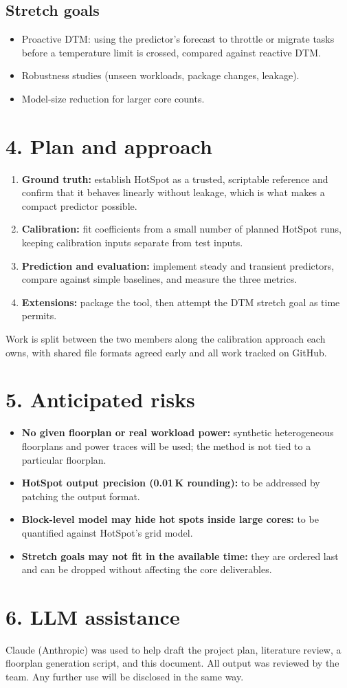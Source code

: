 \documentclass[11pt,a4paper]{article}
\begin{document}
\subsection*{Stretch goals}
\begin{itemize}
  \item Proactive DTM: using the predictor's forecast to throttle or migrate tasks before a
        temperature limit is crossed, compared against reactive DTM.
  \item Robustness studies (unseen workloads, package changes, leakage).
  \item Model-size reduction for larger core counts.
\end{itemize}

\section*{4. Plan and approach}
\begin{enumerate}
  \item \textbf{Ground truth:} establish HotSpot as a trusted, scriptable reference and confirm
        that it behaves linearly without leakage, which is what makes a compact predictor possible.
  \item \textbf{Calibration:} fit coefficients from a small number of planned HotSpot runs,
        keeping calibration inputs separate from test inputs.
  \item \textbf{Prediction and evaluation:} implement steady and transient predictors,
        compare against simple baselines, and measure the three metrics.
  \item \textbf{Extensions:} package the tool, then attempt the DTM stretch goal as time permits.
\end{enumerate}
Work is split between the two members along the calibration approach each owns, with shared file
formats agreed early and all work tracked on GitHub.

\section*{5. Anticipated risks}
\begin{itemize}
  \item \textbf{No given floorplan or real workload power:} synthetic heterogeneous floorplans and
        power traces will be used; the method is not tied to a particular floorplan.
  \item \textbf{HotSpot output precision (0.01\,K rounding):} to be addressed by patching the
        output format.
  \item \textbf{Block-level model may hide hot spots inside large cores:} to be quantified
        against HotSpot's grid model.
  \item \textbf{Stretch goals may not fit in the available time:} they are ordered last and
        can be dropped without affecting the core deliverables.
\end{itemize}

\section*{6. LLM assistance}
Claude (Anthropic) was used to help draft the project plan, literature review, a floorplan
generation script, and this document. All output was reviewed by the team. Any further use will be
disclosed in the same way.
\end{document}
